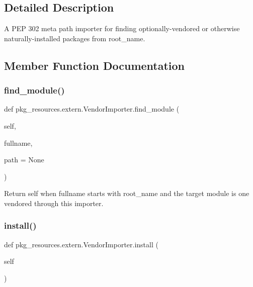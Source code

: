\subsection{Detailed Description}
\begin{DoxyVerb}A PEP 302 meta path importer for finding optionally-vendored
or otherwise naturally-installed packages from root_name.
\end{DoxyVerb}
 

\subsection{Member Function Documentation}
\mbox{\label{classpkg__resources_1_1extern_1_1_vendor_importer_ab949d2b108d3d3fc6016802475b55148}} 
\subsubsection{\texorpdfstring{find\+\_\+module()}{find\_module()}}
{\footnotesize\ttfamily def pkg\+\_\+resources.\+extern.\+Vendor\+Importer.\+find\+\_\+module (\begin{DoxyParamCaption}\item[{}]{self,  }\item[{}]{fullname,  }\item[{}]{path = {\ttfamily None} }\end{DoxyParamCaption})}

\begin{DoxyVerb}Return self when fullname starts with root_name and the
target module is one vendored through this importer.
\end{DoxyVerb}
 \mbox{\label{classpkg__resources_1_1extern_1_1_vendor_importer_a94f50109a30bf7e9e5914c8f0f41b7dc}} 
\subsubsection{\texorpdfstring{install()}{install()}}
{\footnotesize\ttfamily def pkg\+\_\+resources.\+extern.\+Vendor\+Importer.\+install (\begin{DoxyParamCaption}\item[{}]{self }\end{DoxyParamCaption})}

